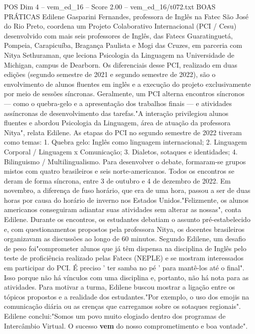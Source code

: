 \begin{textsample}{POS Dim 4 – vem\_ed\_16 – Score 2.00 – vem\_ed\_16/t072.txt}  \label{ex:f4_pos_071}
BOAS PRÁTICAS Edilene Gasparini Fernandes, professora de Inglês na Fatec São José do Rio Preto, coordena um Projeto Colaborativo Internacional (PCI / Cesu) desenvolvido com mais seis professores de Inglês, das Fatecs Guaratinguetá, Pompeia, Carapicuíba, Bragança Paulista e Mogi das Cruzes, em parceria com Nitya Sethuraman, que leciona Psicologia da Linguagem na Universidade de Michigan, campus de Dearborn.
Os diferenciais desse PCI, realizado em duas edições (segundo semestre de 2021 e segundo semestre de 2022), são o envolvimento de alunos fluentes em inglês e a execução do projeto exclusivamente por meio de sessões síncronas.
Geralmente, um PCI alterna encontros síncronos — como o quebra-gelo e a apresentação dos trabalhos finais — e atividades assíncronas de desenvolvimento das tarefas."A interação privilegiou alunos fluentes e abordou Psicologia da Linguagem, área de atuação da professora Nitya", relata Edilene.
As etapas do PCI no segundo semestre de 2022 tiveram como temas: 1.
Quebra gelo: Inglês como linguagem internacional; 2.
Linguagem Corporal / Linguagem x Comunicação; 3.
Dialetos, sotaques e identidades; 4.
Bilinguismo / Multilingualismo.
Para desenvolver o debate, formaram-se grupos mistos com quatro brasileiros e seis norte-americanos.
Todos os encontros se deram de forma síncrona, entre 3 de outubro e 4 de dezembro de 2022.
Em novembro, a diferença de fuso horário, que era de uma hora, passou a ser de duas horas por causa do horário de inverno nos Estados Unidos."Felizmente, os alunos americanos conseguiram adiantar suas atividades sem alterar as nossas", conta Edilene.
Durante os encontros, os estudantes debatiam o assunto pré-estabelecido e, com questionamentos propostos pela professora Nitya, os docentes brasileiros organizavam as discussões ao longo de 60 minutos.
Segundo Edilene, um desafio de peso foi"comprometer alunos que já têm dispensa na disciplina de Inglês pelo teste de proficiência realizado pelas Fatecs (NEPLE) e se mostram interessados em participar do PCI.
É preciso ' ter samba no pé ' para mantê-los até o final".
Isso porque não há vínculos com uma disciplina e, portanto, não há nota para as atividades.
Para motivar a turma, Edilene buscou mostrar a ligação entre os tópicos propostos e a realidade dos estudantes."Por exemplo, o uso dos emojis na comunicação diária ou as crenças que carregamos sobre os sotaques regionais".
Edilene conclui:"Somos um povo muito elogiado dentro dos programas de Intercâmbio Virtual.
O sucesso \textbf{vem} do nosso comprometimento e boa vontade".

\end{textsample}
